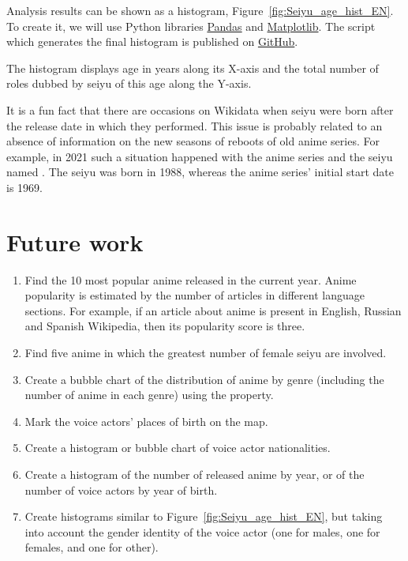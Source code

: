 Analysis results can be shown as a histogram, Figure~\ref{fig:Seiyu_age_hist_EN}. To create it, we will use Python libraries \href{https://en.wikipedia.org/wiki/Pandas\_(software)}{Pandas} and \href{https://en.wikipedia.org/wiki/Matplotlib}{Matplotlib}. The script which generates the final histogram is published on \href{https://git.io/J1UGA}{GitHub}.

The histogram displays age in years along its X-axis and the total number of roles dubbed by seiyu of this age along the Y-axis.

It is a fun fact that there are occasions on Wikidata when seiyu were born after the release date in which they performed. This issue is probably related to an absence of information on the new seasons of reboots of old anime series. For example, in 2021 such a situation happened with the anime series  and the seiyu named . The seiyu was born in 1988, whereas the anime series’ initial start date is 1969.

\section{Future work}

\begin{enumerate}
	\item Find the \num{10} most popular anime released in the current year. Anime popularity is estimated by the number of articles in different language sections. For example, if an article about anime is present in English, Russian and Spanish Wikipedia, then its popularity score is three.
	\item Find five anime in which the greatest number of female seiyu are involved.
	\item Create a bubble chart of the distribution of anime by genre (including the number of anime in each genre) using the  property.
	\item Mark the voice actors' places of birth on the map.
	\item Create a histogram or bubble chart of voice actor nationalities.
	\item Create a histogram of the number of released anime by year, or of the number of voice actors by year of birth.
	\item Create histograms similar to Figure~\ref{fig:Seiyu_age_hist_EN}, but taking into account the gender identity of the voice actor (one for males, one for females, and one for other).
\end{enumerate}

